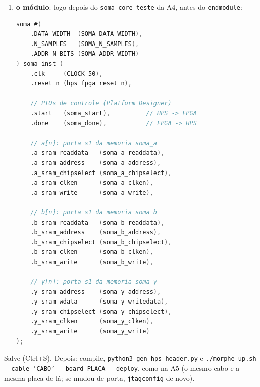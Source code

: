 \documentclass[11pt,a4paper,oneside]{article}
\begin{document}
\begin{faca}
\begin{enumerate}
\begin{lstlisting}[language=Verilog]
    .soma_a_address          (soma_a_address),
    .soma_a_clken            (soma_a_clken),
    .soma_a_chipselect       (soma_a_chipselect),
    .soma_a_write            (soma_a_write),
    .soma_a_readdata         (soma_a_readdata),
    .soma_a_writedata        (soma_a_writedata),
    .soma_a_byteenable       (soma_a_byteenable),

    .soma_b_address          (soma_b_address),
    .soma_b_clken            (soma_b_clken),
    .soma_b_chipselect       (soma_b_chipselect),
    .soma_b_write            (soma_b_write),
    .soma_b_readdata         (soma_b_readdata),
    .soma_b_writedata        (soma_b_writedata),
    .soma_b_byteenable       (soma_b_byteenable),

    .soma_y_address          (soma_y_address),
    .soma_y_clken            (soma_y_clken),
    .soma_y_chipselect       (soma_y_chipselect),
    .soma_y_write            (soma_y_write),
    .soma_y_readdata         (soma_y_readdata),
    .soma_y_writedata        (soma_y_writedata),
    .soma_y_byteenable       (soma_y_byteenable),
\end{lstlisting}
  \item \textbf{o módulo}: logo depois do \texttt{soma\_core\_teste} da A4,
    antes do \texttt{endmodule}:
\begin{lstlisting}[language=Verilog]
soma #(
    .DATA_WIDTH  (SOMA_DATA_WIDTH),
    .N_SAMPLES   (SOMA_N_SAMPLES),
    .ADDR_N_BITS (SOMA_ADDR_WIDTH)
) soma_inst (
    .clk     (CLOCK_50),
    .reset_n (hps_fpga_reset_n),

    // PIOs de controle (Platform Designer)
    .start   (soma_start),          // HPS -> FPGA
    .done    (soma_done),           // FPGA -> HPS

    // a[n]: porta s1 da memoria soma_a
    .a_sram_readdata   (soma_a_readdata),
    .a_sram_address    (soma_a_address),
    .a_sram_chipselect (soma_a_chipselect),
    .a_sram_clken      (soma_a_clken),
    .a_sram_write      (soma_a_write),

    // b[n]: porta s1 da memoria soma_b
    .b_sram_readdata   (soma_b_readdata),
    .b_sram_address    (soma_b_address),
    .b_sram_chipselect (soma_b_chipselect),
    .b_sram_clken      (soma_b_clken),
    .b_sram_write      (soma_b_write),

    // y[n]: porta s1 da memoria soma_y
    .y_sram_address    (soma_y_address),
    .y_sram_wdata      (soma_y_writedata),
    .y_sram_chipselect (soma_y_chipselect),
    .y_sram_clken      (soma_y_clken),
    .y_sram_write      (soma_y_write)
);
\end{lstlisting}
\end{enumerate}
Salve (Ctrl+S). Depois: compile, \texttt{python3 gen\_hps\_header.py} e
\texttt{./morphe-up.sh -{}-cable 'CABO' -{}-board PLACA -{}-deploy}, como na
A5 (o mesmo cabo e a mesma placa de lá; se mudou de porta, \texttt{jtagconfig} de novo).
\end{faca}
\end{document}
